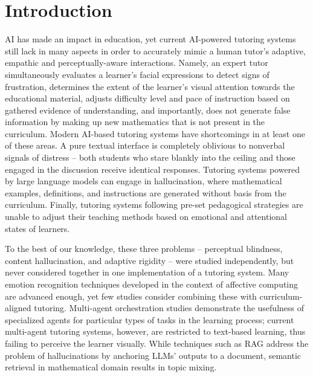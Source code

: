 \documentclass[conference, letterpaper]{IEEEtran}
\begin{document}
\IEEEpeerreviewmaketitle

\section{Introduction}

AI has made an impact in education, yet current AI-powered tutoring systems still lack in many aspects in order to accurately mimic a human tutor's adaptive, empathic and perceptually-aware interactions. Namely, an expert tutor simultaneously evaluates a learner's facial expressions to detect signs of frustration, determines the extent of the learner's visual attention towards the educational material, adjusts difficulty level and pace of instruction based on gathered evidence of understanding, and importantly, does not generate false information by making up new mathematics that is not present in the curriculum. Modern AI-based tutoring systems have shortcomings in at least one of these areas. A pure textual interface is completely oblivious to nonverbal signals of distress – both students who stare blankly into the ceiling and those engaged in the discussion receive identical responses. Tutoring systems powered by large language models can engage in hallucination, where mathematical examples, definitions, and instructions are generated without basis from the curriculum. Finally, tutoring systems following pre-set pedagogical strategies are unable to adjust their teaching methods based on emotional and attentional states of learners.

To the best of our knowledge, these three problems – perceptual blindness, content hallucination, and adaptive rigidity – were studied independently, but never considered together in one implementation of a tutoring system. Many emotion recognition techniques developed in the context of affective computing are advanced enough, yet few studies consider combining these with curriculum-aligned tutoring. Multi-agent orchestration studies demonstrate the usefulness of specialized agents for particular types of tasks in the learning process; current multi-agent tutoring systems, however, are restricted to text-based learning, thus failing to perceive the learner visually. While techniques such as RAG address the problem of hallucinations by anchoring LLMs' outputs to a document, semantic retrieval in mathematical domain results in topic mixing.
\end{document}
